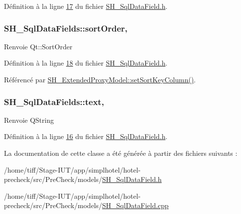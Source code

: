 Définition à la ligne \hyperlink{SH__SqlDataField_8h_source_l00017}{17} du fichier \hyperlink{SH__SqlDataField_8h_source}{S\-H\-\_\-\-Sql\-Data\-Field.\-h}.

\hypertarget{classSH__SqlDataFields_a67b20d296535d6b9dda6c85f75427ad1}{
\subsubsection[{sort\-Order}]{\setlength{\rightskip}{0pt plus 5cm}S\-H\-\_\-\-Sql\-Data\-Fields\-::sort\-Order\hspace{0.3cm}{\ttfamily [read]}, {\ttfamily [write]}}}\label{classSH__SqlDataFields_a67b20d296535d6b9dda6c85f75427ad1}
\begin{DoxyReturn}{Renvoie}
Qt\-::\-Sort\-Order 
\end{DoxyReturn}


Définition à la ligne \hyperlink{SH__SqlDataField_8h_source_l00018}{18} du fichier \hyperlink{SH__SqlDataField_8h_source}{S\-H\-\_\-\-Sql\-Data\-Field.\-h}.



Référencé par \hyperlink{classSH__ExtendedProxyModel_ab8123244a5060aa35f5bce651046b99d}{S\-H\-\_\-\-Extended\-Proxy\-Model\-::set\-Sort\-Key\-Column()}.

\hypertarget{classSH__SqlDataFields_aaffdb7a0a20775a3ea44a4c3eb5dc23d}{
\subsubsection[{text}]{\setlength{\rightskip}{0pt plus 5cm}S\-H\-\_\-\-Sql\-Data\-Fields\-::text\hspace{0.3cm}{\ttfamily [read]}, {\ttfamily [write]}}}\label{classSH__SqlDataFields_aaffdb7a0a20775a3ea44a4c3eb5dc23d}
\begin{DoxyReturn}{Renvoie}
Q\-String 
\end{DoxyReturn}


Définition à la ligne \hyperlink{SH__SqlDataField_8h_source_l00016}{16} du fichier \hyperlink{SH__SqlDataField_8h_source}{S\-H\-\_\-\-Sql\-Data\-Field.\-h}.



La documentation de cette classe a été générée à partir des fichiers suivants \-:\begin{DoxyCompactItemize}
\item 
/home/tiff/\-Stage-\/\-I\-U\-T/app/simplhotel/hotel-\/precheck/src/\-Pre\-Check/models/\hyperlink{SH__SqlDataField_8h}{S\-H\-\_\-\-Sql\-Data\-Field.\-h}\item 
/home/tiff/\-Stage-\/\-I\-U\-T/app/simplhotel/hotel-\/precheck/src/\-Pre\-Check/models/\hyperlink{SH__SqlDataField_8cpp}{S\-H\-\_\-\-Sql\-Data\-Field.\-cpp}\end{DoxyCompactItemize}
